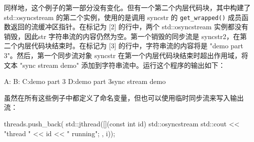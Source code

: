 同样地，这个例子的第一部分没有变化。但有一个第二个内层代码块，其中构建了 std::osyncstream 的第二个实例，使用的是调用 syncstr 的 \verb|get_wrapped()| 成员函数返回的流缓冲区指针。在标记为 [2] 的行中，两个 std::osyncstream 实例都没有销毁，因此str 字符串流的内容仍然为空。第一个销毁的同步流是 syncstr2，在第二个内层代码块结束时。在标记为 [3] 的行中，字符串流的内容将是 "demo part 3"。然后，第一个同步流对象 syncstr 在第一个内层代码块结束时超出作用域，将文本 "sync stream demo" 添加到字符串流中。运行这个程序的输出如下：

\begin{shell}
A:
B:
C:demo part 3
D:demo part 3sync stream demo
\end{shell}

虽然在所有这些例子中都定义了命名变量，但也可以使用临时同步流来写入输出流：

\begin{cpp}
threads.push_back(
    std::jthread([](const int id)
        {
            std::osyncstream{ std::cout } << "thread " << id
                                          << " running\n";
        }, i));
\end{cpp}

